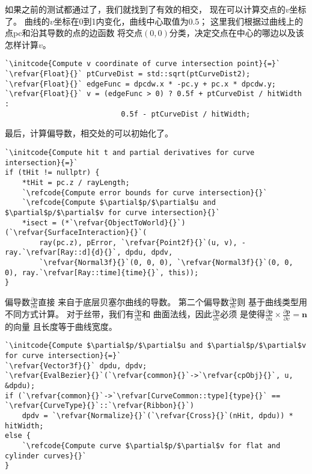 如果之前的测试都通过了，我们就找到了有效的相交，
现在可以计算交点的$v$坐标了。
曲线的$v$坐标在0到1内变化，曲线中心取值为0.5；
这里我们根据过曲线上的点{\ttfamily pc}和沿其导数的点的边函数
将交点$(0,0)$分类，决定交点在中心的哪边以及该怎样计算$v$。
\begin{lstlisting}
`\initcode{Compute v coordinate of curve intersection point}{=}`
`\refvar{Float}{}` ptCurveDist = std::sqrt(ptCurveDist2);
`\refvar{Float}{}` edgeFunc = dpcdw.x * -pc.y + pc.x * dpcdw.y;
`\refvar{Float}{}` v = (edgeFunc > 0) ? 0.5f + ptCurveDist / hitWidth :
                           0.5f - ptCurveDist / hitWidth;
\end{lstlisting}

最后，计算偏导数，相交处的可以初始化了。
\begin{lstlisting}
`\initcode{Compute hit t and partial derivatives for curve intersection}{=}`
if (tHit != nullptr) {
    *tHit = pc.z / rayLength;
    `\refcode{Compute error bounds for curve intersection}{}`
    `\refcode{Compute $\partial$p/$\partial$u and $\partial$p/$\partial$v for curve intersection}{}`
    *isect = (*`\refvar{ObjectToWorld}{}`)(`\refvar{SurfaceInteraction}{}`(
        ray(pc.z), pError, `\refvar{Point2f}{}`(u, v), -ray.`\refvar[Ray::d]{d}{}`, dpdu, dpdv,
        `\refvar{Normal3f}{}`(0, 0, 0), `\refvar{Normal3f}{}`(0, 0, 0), ray.`\refvar[Ray::time]{time}{}`, this));
}
\end{lstlisting}

偏导数$\displaystyle\frac{\partial \bm p}{\partial u}$直接
来自于底层贝塞尔曲线的导数。
第二个偏导数$\displaystyle\frac{\partial \bm p}{\partial v}$则
基于曲线类型用不同方式计算。
对于丝带，我们有$\displaystyle\frac{\partial \bm p}{\partial u}$和
曲面法线，因此$\displaystyle\frac{\partial \bm p}{\partial v}$必须
是使得$\displaystyle\frac{\partial \bm p}{\partial u}\times\frac{\partial \bm p}{\partial v}=\bm n$的向量
且长度等于曲线宽度。
\begin{lstlisting}
`\initcode{Compute $\partial$p/$\partial$u and $\partial$p/$\partial$v for curve intersection}{=}`
`\refvar{Vector3f}{}` dpdu, dpdv;
`\refvar{EvalBezier}{}`(`\refvar{common}{}`->`\refvar{cpObj}{}`, u, &dpdu);
if (`\refvar{common}{}`->`\refvar[CurveCommon::type]{type}{}` == `\refvar{CurveType}{}`::`\refvar{Ribbon}{}`)
    dpdv = `\refvar{Normalize}{}`(`\refvar{Cross}{}`(nHit, dpdu)) * hitWidth;
else {
    `\refcode{Compute curve $\partial$p/$\partial$v for flat and cylinder curves}{}`
}
\end{lstlisting}

